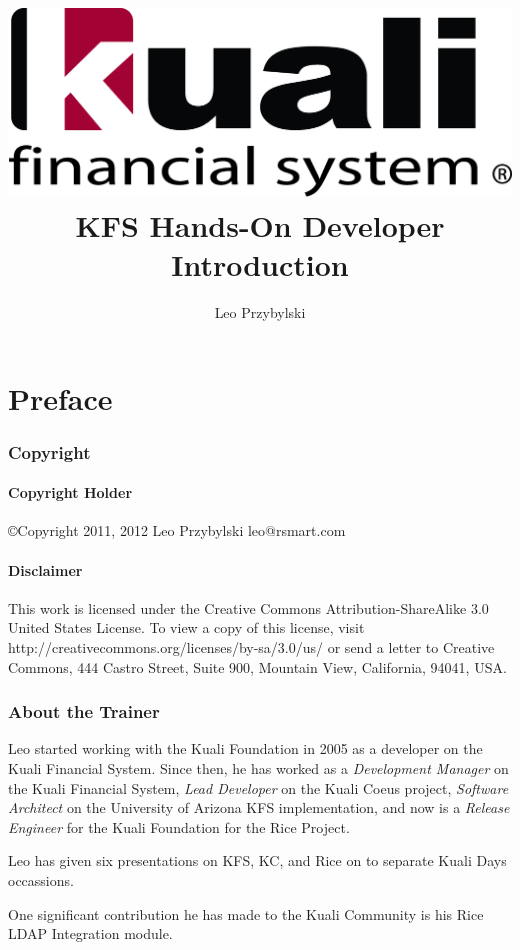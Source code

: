 \documentclass[letterpaper,notitlepage,12pt]{book}
\author{Leo Przybylski}
\title{\includegraphics[width=\textwidth]{cover.png}\\KFS Hands-On Developer Introduction}
\date{}
\begin{document}
\maketitle
\tableofcontents

\part*{Preface}

\section*{Copyright}
\subsection*{Copyright Holder}
\copyright Copyright 2011, 2012
Leo Przybylski
leo@rsmart.com

\subsection*{Disclaimer}
This work is licensed under the Creative Commons Attribution-ShareAlike 3.0 United States License. To view a copy of this license, visit http://creativecommons.org/licenses/by-sa/3.0/us/ or send a letter to Creative Commons, 444 Castro Street, Suite 900, Mountain View, California, 94041, USA.

\section*{About the Trainer}
Leo started working with the Kuali Foundation in 2005 as a developer
on the Kuali Financial System. Since then, he has worked as a
\emph{Development Manager} on the Kuali Financial System, \emph{Lead Developer} on
the Kuali Coeus project, \emph{Software Architect} on the University of
Arizona KFS implementation, and now is a \emph{Release Engineer} for the
Kuali Foundation for the Rice Project. 

Leo has given six presentations on KFS, KC, and Rice on to separate
Kuali Days occassions. 

One significant contribution he has made to the Kuali Community is his
Rice LDAP Integration module.

\end{document}
